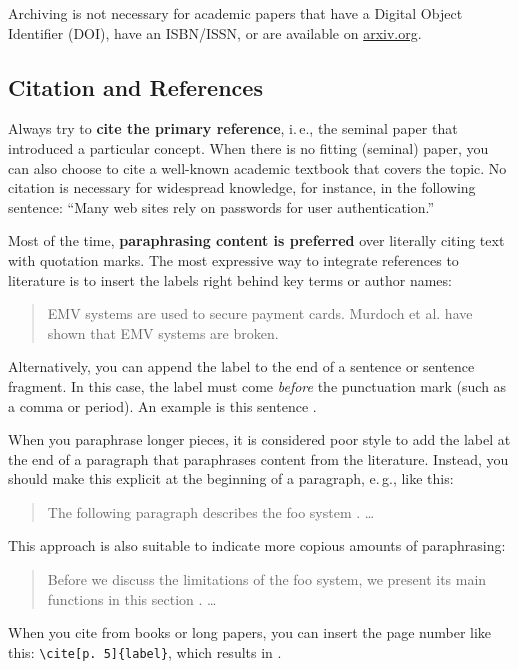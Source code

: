 Archiving is not necessary for academic papers that have a Digital Object Identifier (DOI), have an ISBN/ISSN, or are available on \url{arxiv.org}.


\subsection{Citation and References}

Always try to \textbf{cite the primary reference},
i.\,e., the seminal paper that introduced a particular concept. When there is no fitting (seminal) paper, you can also choose to cite a well-known academic textbook that covers the topic. No citation is necessary for widespread knowledge, for instance, in the following sentence: ``Many web sites rely on passwords for user authentication.''

Most of the time, \textbf{paraphrasing content is preferred} over literally citing text with quotation marks. The most expressive way to integrate references to literature is to insert the labels right behind key terms or author names:
\begin{quote}
  EMV systems \cite{anderson_ross_emv:_2014} are used to secure payment cards. Murdoch et al. \cite{murdoch_steven_j._chip_2010} have shown that EMV systems are broken.
\end{quote}

Alternatively, you can append the label to the end of a sentence or sentence fragment. In this case, the label must come \emph{before} the punctuation mark (such as a comma or period). An example is this sentence \cite{Hintz02}.

When you paraphrase longer pieces, it is considered poor style to add the label at the end of a paragraph that paraphrases content from the literature. Instead, you should make this explicit at the beginning of a paragraph, e.\,g., like this:
\begin{quote}
  The following paragraph describes the foo system \cite{kou_weidong_secure_2003}. …
\end{quote}

This approach is also suitable to indicate more copious amounts of paraphrasing:
\begin{quote}
  Before we discuss the limitations of the foo system, we present its main functions in this section \cite{kou_weidong_secure_2003}. …
\end{quote}

When you cite from books or long papers, you can insert the page number like this: \verb|\cite[p. 5]{label}|, which results in \cite[p. 5]{kou_weidong_secure_2003}.

